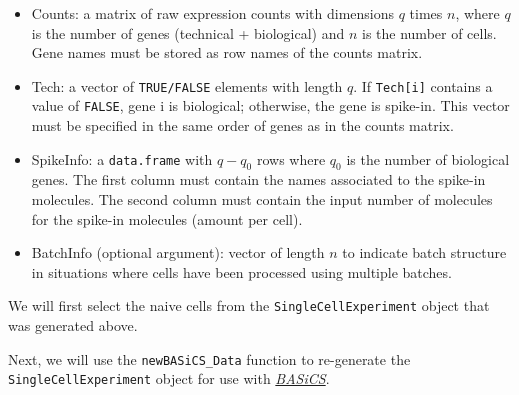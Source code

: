\documentclass[9pt,a4paper,]{extarticle}
\newenvironment{Shaded}{\begin{snugshade}}{\end{snugshade}}
\newcommand{\DecValTok}[1]{\textcolor[rgb]{0.00,0.00,0.81}{#1}}
\newcommand{\KeywordTok}[1]{\textcolor[rgb]{0.13,0.29,0.53}{\textbf{#1}}}
\newcommand{\NormalTok}[1]{#1}
\newcommand{\OperatorTok}[1]{\textcolor[rgb]{0.81,0.36,0.00}{\textbf{#1}}}
\newcommand{\StringTok}[1]{\textcolor[rgb]{0.31,0.60,0.02}{#1}}
\begin{document}
\begin{itemize}
\item
  Counts: a matrix of raw expression counts with dimensions \(q\) times \(n\),
  where \(q\) is the number of genes (technical + biological) and \(n\) is the number
  of cells. Gene names must be stored as row names of the counts matrix.
\item
  Tech: a vector of \texttt{TRUE/FALSE} elements with length \(q\). If \texttt{Tech{[}i{]}} contains
  a value of \texttt{FALSE}, gene i is biological;
  otherwise, the gene is spike-in. This vector must
  be specified in the same order of genes as in the counts matrix.
\item
  SpikeInfo: a \texttt{data.frame} with \(q-q_0\) rows where \(q_0\) is the number
  of biological genes. The first column must contain the names associated to
  the spike-in molecules. The second column must contain the input number of
  molecules for the spike-in molecules (amount per cell).
\item
  BatchInfo (optional argument): vector of length \(n\) to indicate batch
  structure in situations where cells have been processed using multiple
  batches.
\end{itemize}

We will first select the naive cells from the \texttt{SingleCellExperiment} object
that was generated above.

\begin{Shaded}
\end{Shaded}

Next, we will use the \texttt{newBASiCS\_Data} function to re-generate the
\texttt{SingleCellExperiment} object for use with \emph{\href{https://bioconductor.org/packages/3.11/BASiCS}{BASiCS}}.
\end{document}
